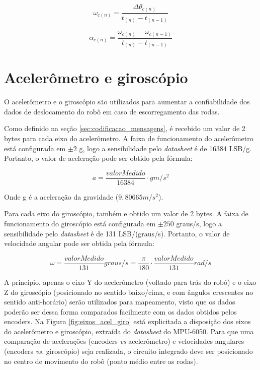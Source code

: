 \begin{equation}
  \omega_{c (n)} = \frac{\Delta \theta_{c (n)} }{t_{(n)} - t_{(n-1)}}
  \label{eq:omega_encoders}
\end{equation}

\begin{equation}
  \alpha_{c (n)} = \frac{\omega_{c (n)} - \omega_{c (n-1)}}{t_{(n)} - t_{(n-1)}}
  \label{eq:alpha_encoders}
\end{equation}


\section{Acelerômetro e giroscópio}
\label{sec:teoria_acel_giro}

O acelerômetro e o giroscópio são utilizados para aumentar a confiabilidade dos dados de deslocamento do robô em caso de escorregamento das rodas.

Como definido na seção \ref{sec:codificacao_mensagens}, é recebido um valor de 2 bytes para cada eixo do acelerômetro. A faixa de funcionamento do acelerômetro está configurada em $\pm 2$ g, logo a sensibilidade pelo \textit{datasheet} é de 16384 LSB/g. Portanto, o valor de aceleração pode ser obtido pela fórmula:

\begin{equation}
  a = \frac{valorMedido}{16384} \cdot g \unit{m/s^2}
  \label{eq:acel}
\end{equation}

Onde g é a aceleração da gravidade ($9,80665 \unit{m/s^2}$). 

Para cada eixo do giroscópio, também e obtido um valor de 2 bytes. A faixa de funcionamento do giroscópio está configurada em $\pm 250$ graus/s, logo a sensibilidade pelo \textit{datasheet} é de 131 LSB/(graus/s). Portanto, o valor de velocidade angular pode ser obtida pela fórmula:

\begin{equation}
  \omega = \frac{valorMedido}{131} \unit{graus/s} = \frac{\pi}{180} \cdot \frac{valorMedido}{131} \unit{rad/s}
  \label{eq:giro}
\end{equation}


A princípio, apenas o eixo Y do acelerômetro (voltado para trás do robô) e o eixo Z do giroscópio (posicionado no sentido baixo/cima, e com ângulos crescentes no sentido anti-horário) serão utilizados para mapeamento, visto que os dados poderão ser dessa forma comparados facilmente com os dados obtidos pelos encoders. Na Figura \ref{fig:eixos_acel_giro} está explicitada a disposição dos eixos do acelerômetro e giroscópio, extraída do \textit{datasheet} do MPU-6050. Para que uma comparação de acelerações (encoders \textit{vs} acelerômetro) e velocidades angulares (encoders \textit{vs.} giroscópio) seja realizada, o circuito integrado deve ser posicionado no centro de movimento do robô (ponto médio entre as rodas).

